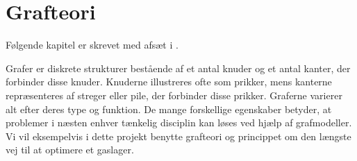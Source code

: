 \chapter{Grafteori}
Følgende kapitel er skrevet med afsæt i \citep{dmat}.

Grafer er diskrete strukturer bestående af et antal knuder og et antal kanter, der forbinder disse knuder. Knuderne illustreres ofte som prikker, mens kanterne repræsenteres af streger eller pile, der forbinder disse prikker. Graferne varierer alt efter deres type og funktion. De mange forskellige egenskaber betyder, at problemer i næsten enhver tænkelig disciplin kan løses ved hjælp af grafmodeller. Vi vil eksempelvis i dette projekt benytte grafteori og princippet om den længste vej til at optimere et gaslager.















